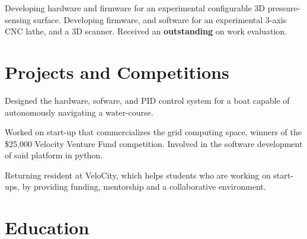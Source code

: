 \documentclass[11pt,a4paper]{moderncv}
\begin{document}

{Developing hardware and firmware for an experimental configurable 3D pressure-sensing surface.
    \newline{}Developing firmware, and software for an experimental 3-axis CNC lathe, and a 3D scanner.
\newline{}Received an \textbf{outstanding} on work evaluation.}

\section{Projects and Competitions}

{Designed the hardware, sofware, and PID control system for a boat capable of autonomously navigating a water-course.}

{Worked on start-up that commercializes the grid computing space, winners of the \$25,000 Velocity Venture Fund competition.
\newline{}Involved in the software development of said platform in python.}

{Returning resident at VeloCity, which helps students who are working on start-ups, by providing funding, mentorship and a collaborative environment.}

\section{Education}
\end{document}
